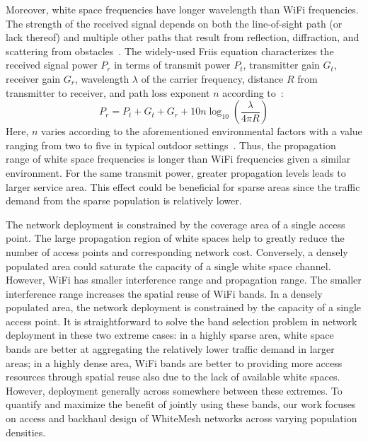 Moreover, white space frequencies have longer wavelength than WiFi frequencies. 
The strength of the received signal depends on both the line-of-sight path (or lack 
thereof) and multiple other paths that result from reflection, diffraction, and scattering 
from obstacles~\cite{andersen1995propagation}. The widely-used Friis equation characterizes 
the received signal power $P_r$ in terms of transmit power $P_t$, transmitter gain $G_t$, 
receiver gain $G_r$, wavelength $\lambda$ of the carrier frequency, distance $R$ from transmitter 
to receiver, and path loss exponent $n$ according to~\cite{friis}:
\begin{equation}
\label{eq:friis}
P_r=P_t+G_t+G_r+10n \log_{10}\left( \frac{\lambda}{4\pi R}\right)
\end{equation}
Here, $n$ varies according to the aforementioned environmental factors with a value 
ranging from two to five in typical outdoor settings~\cite{rappaport}.
Thus, the propagation range of white space frequencies is longer than WiFi frequencies
given a similar environment. For the same transmit power, greater propagation levels leads to larger service area.
This effect could be beneficial for sparse areas since the traffic demand from the sparse population is relatively lower. 

The network deployment is constrained by the coverage area of a single access point. 
The large propagation region of white spaces help to greatly reduce the number of access points and corresponding network cost. 
Conversely, a densely populated area could saturate the capacity of a single white space channel. 
However, WiFi has smaller interference range and propagation range. The smaller interference range increases 
the spatial reuse of WiFi bands. In a densely populated area, the network deployment is constrained by the 
capacity of a single access point. It is straightforward to solve the band selection problem in network deployment 
in these two extreme cases: in a highly sparse area, white space bands are better at aggregating the 
relatively lower traffic demand in larger areas; in a highly dense area, WiFi bands are better to 
providing more access resources through spatial reuse also due to the lack of available white spaces.
However, deployment generally across somewhere between these extremes. 
To quantify and maximize the benefit of jointly using these bands, 
our work focuses on access and backhaul design of WhiteMesh networks across varying population densities. 



